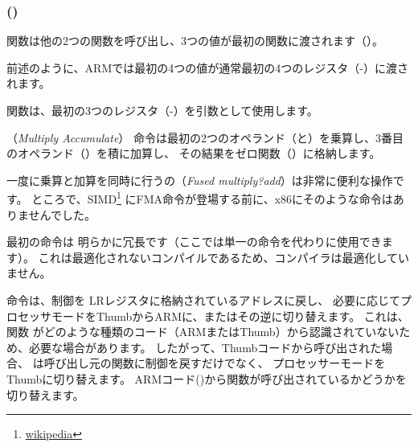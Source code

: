 \subsubsection{\NonOptimizingKeilVI (\ARMMode)}



\main 関数は他の2つの関数を呼び出し、3つの値が最初の関数に渡されます（\ttf）。

前述のように、ARMでは最初の4つの値が通常最初の4つのレジスタ（-）に渡されます。

\ttf 関数は、最初の3つのレジスタ（-）を引数として使用します。

（\emph{Multiply Accumulate}）
命令は最初の2つのオペランド（と）を乗算し、3番目のオペランド（）を積に加算し、
その結果をゼロ関数（）に格納します。

一度に乗算と加算を同時に行うの（\emph{Fused multiply?add}）は非常に便利な操作です。
ところで、SIMD\footnote{\href{https://en.wikipedia.org/wiki/FMA_instruction_set}{wikipedia}}
にFMA命令が登場する前に、x86にそのような命令はありませんでした。

最初の命令は
明らかに冗長です（ここでは単一の命令を代わりに使用できます）。
これは最適化されないコンパイルであるため、コンパイラは最適化していません。


命令は、制御を \ac{LR}レジスタに格納されているアドレスに戻し、
必要に応じてプロセッサモードをThumbからARMに、またはその逆に切り替えます。
これは、関数 \ttf がどのような種類のコード（ARMまたはThumb）から認識されていないため、必要な場合があります。
したがって、Thumbコードから呼び出された場合、
は呼び出し元の関数に制御を戻すだけでなく、
プロセッサーモードをThumbに切り替えます。 
ARMコード()から関数が呼び出されているかどうかを切り替えます。
